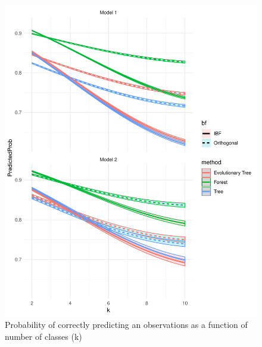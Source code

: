 \documentclass[]{elsarticle} %
\makeatletter
\def\maxwidth{\ifdim\Gin@nat@width>\linewidth\linewidth
\else\Gin@nat@width\fi}
\let\Oldincludegraphics\includegraphics
\renewcommand{\includegraphics}[1]{\Oldincludegraphics[width=\maxwidth]{#1}}
\makeatother
\begin{document}
\begin{figure}
\centering
\includegraphics{Trees_with_Base_Functions_v3_files/figure-latex/fig14-estimated-accuracy-k-1.pdf}
\caption{\label{fig:fig14-estimated-accuracy-k}Probability of correctly
predicting an observations as a function of number of classes (k)}
\end{figure}
\end{document}
